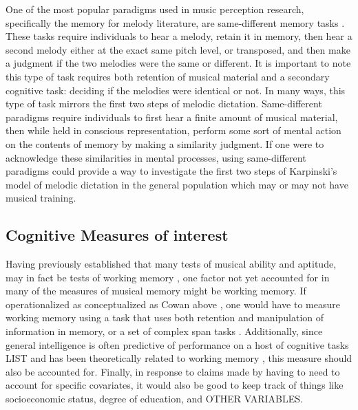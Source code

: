 \documentclass[]{book}
\begin{document}
One of the most popular paradigms used in music perception research, specifically the memory for melody literature, are same-different memory tasks \citep{halpernMemoryMelodies2010}.
These tasks require individuals to hear a melody, retain it in memory, then hear a second melody either at the exact same pitch level, or transposed, and then make a judgment if the two melodies were the same or different.
It is important to note this type of task requires both retention of musical material and a secondary cognitive task: deciding if the melodies were identical or not.
In many ways, this type of task mirrors the first two steps of melodic dictation.
Same-different paradigms require individuals to first hear a finite amount of musical material, then while held in conscious representation, perform some sort of mental action on the contents of memory by making a similarity judgment.
If one were to acknowledge these similarities in mental processes, using same-different paradigms could provide a way to investigate the first two steps of Karpinski's model of melodic dictation in the general population which may or may not have musical training.

\hypertarget{cognitive-measures-of-interest}{%
\subsection{Cognitive Measures of interest}\label{cognitive-measures-of-interest}}

Having previously established that many tests of musical ability and aptitude, may in fact be tests of working memory \citep{berzWorkingMemoryMusic1995}, one factor not yet accounted for in many of the measures of musical memory might be working memory.
If operationalized as conceptualized as Cowan above \citep{cowanMagicalMysteryFour2010}, one would have to measure working memory using a task that uses both retention and manipulation of information in memory, or a set of complex span tasks \citep{unsworthAutomatedVersionOperation2005}.
Additionally, since general intelligence is often predictive of performance on a host of cognitive tasks LIST and has been theoretically related to working memory \citep{kovacsProcessOverlapTheory2016}, this measure should also be accounted for.
Finally, in response to claims made by \citep{okadaIndividualDifferencesMusical2018a} having to need to account for specific covariates, it would also be good to keep track of things like socioeconomic status, degree of education, and OTHER VARIABLES.
\end{document}
